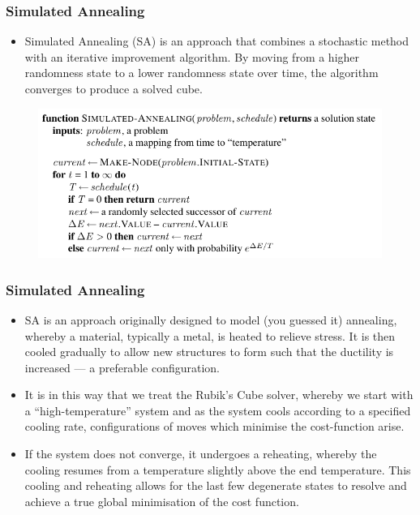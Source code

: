 \documentclass[UKenglish]{beamer}
\begin{document}
\begin{frame}
  \frametitle{Simulated Annealing}
  \begin{itemize}
  \item Simulated Annealing (SA) is an approach that combines a stochastic method with an iterative improvement algorithm. By moving from a higher randomness state to a lower randomness state over time, the algorithm converges to produce a solved cube.
  \end{itemize}

  \begin{figure}
    \centering
    \includegraphics[width=0.75\linewidth]{simulated-annealing}
  \end{figure}
\end{frame}

\begin{frame}
  \frametitle{Simulated Annealing}
  \begin{itemize}
  \item SA is an approach originally designed to model (you guessed it) annealing, whereby a material, typically a metal, is heated to relieve stress. It is then cooled gradually to allow new structures to form such that the ductility is increased --- a preferable configuration.
  \item It is in this way that we treat the Rubik's Cube solver, whereby we start with a ``high-temperature'' system and as the system cools according to a specified cooling rate, configurations of moves which minimise the cost-function arise.
  \item If the system does not converge, it undergoes a reheating, whereby the cooling resumes from a temperature slightly above the end temperature. This cooling and reheating allows for the last few degenerate states to resolve and achieve a true global minimisation of the cost function.
  \end{itemize}
\end{frame}
\end{document}
